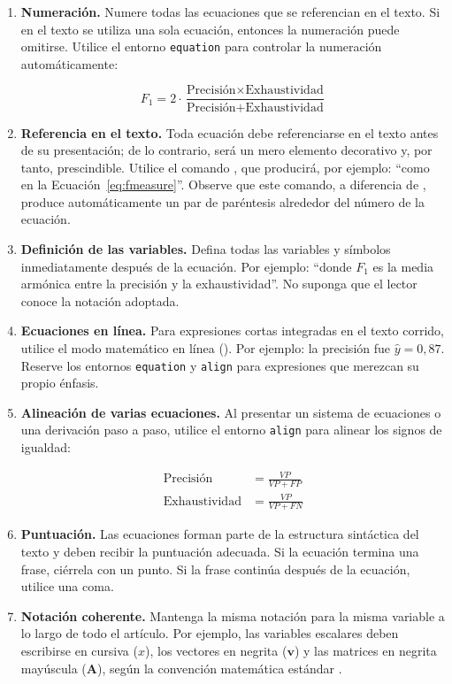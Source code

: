 \documentclass[spanish]{rbie2026}%
\begin{document}
\begin{enumerate}
  \item \textbf{Numeración.} Numere todas las ecuaciones que se referencian en el texto. Si en el texto se utiliza una sola ecuación, entonces la numeración puede omitirse. Utilice el entorno \texttt{equation} para controlar la numeración automáticamente:

\begin{equation}
  \label{eq:fmeasure}
  F_1 = 2 \cdot \frac{\text{Precisión} \times \text{Exhaustividad}}
                     {\text{Precisión} + \text{Exhaustividad}}
\end{equation}

  \item \textbf{Referencia en el texto.} Toda ecuación debe referenciarse en el texto antes de su presentación; de lo contrario, será un mero elemento decorativo y, por tanto, prescindible. Utilice el comando \fakeverb{\eqref{etiqueta}}, que producirá, por ejemplo: ``como en la Ecuación~\eqref{eq:fmeasure}''. Observe que este comando, a diferencia de \fakeverb{\ref}, produce automáticamente un par de paréntesis alrededor del número de la ecuación.

  \item \textbf{Definición de las variables.} Defina todas las variables y símbolos inmediatamente después de la ecuación. Por ejemplo: ``donde $F_1$ es la media armónica entre la precisión y la exhaustividad''. No suponga que el lector conoce la notación adoptada.

  \item \textbf{Ecuaciones en línea.} Para expresiones cortas integradas en el texto corrido, utilice el modo matemático en línea (). Por ejemplo: la precisión fue $\hat{y} = 0{,}87$. Reserve los entornos \texttt{equation} y \texttt{align} para expresiones que merezcan su propio énfasis.

  \item \textbf{Alineación de varias ecuaciones.} Al presentar un sistema de ecuaciones o una derivación paso a paso, utilice el entorno \texttt{align} para alinear los signos de igualdad:

\begin{align}
  \text{Precisión} &= \frac{VP}{VP + FP} \\
  \text{Exhaustividad} &= \frac{VP}{VP + FN}
\end{align}

  \item \textbf{Puntuación.} Las ecuaciones forman parte de la estructura sintáctica del texto y deben recibir la puntuación adecuada. Si la ecuación termina una frase, ciérrela con un punto. Si la frase continúa después de la ecuación, utilice una coma.

  \item \textbf{Notación coherente.} Mantenga la misma notación para la misma variable a lo largo de todo el artículo. Por ejemplo, las variables escalares deben escribirse en cursiva ($x$), los vectores en negrita ($\mathbf{v}$) y las matrices en negrita mayúscula ($\mathbf{A}$), según la convención matemática estándar \citep{AMS2021handbook, Higham2020handbook, Knuth1989mathematical}.
\end{enumerate}
\end{document}
